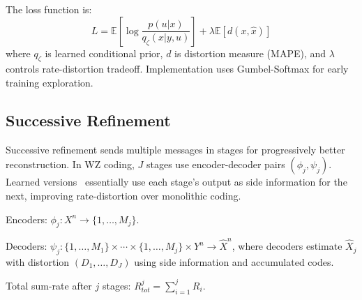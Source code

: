 The loss function is:
\begin{equation}
{L} = \mathbb{E} \left[ \log \frac{p(u|x)}{q_\zeta(x|y, u)} \right] + \lambda \mathbb{E}[d(x, \hat{x})]
\end{equation}
where $q_\zeta$ is learned conditional prior, $d$ is distortion measure (MAPE), and $\lambda$ controls rate-distortion tradeoff. Implementation uses Gumbel-Softmax for early training exploration.

\subsection{Successive Refinement}
\label{ssec:backSR}
Successive refinement sends multiple messages in stages for progressively better reconstruction. In WZ coding, $J$ stages use encoder-decoder pairs $(\phi_j, \psi_j)$. Learned versions~\cite{BorisLayeredWZ} essentially use each stage's output as side information for the next, improving rate-distortion over monolithic coding.

Encoders: $\phi_j : X^n \rightarrow \{1, \ldots, M_j\}$.

Decoders: $\psi_j : \{1, \ldots, M_1\} \times \cdots \times \{1, \ldots, M_j\} \times Y^n \rightarrow \hat{X}^n$, where decoders estimate $\hat{X}_j$ with distortion $(D_1, \ldots, D_J)$ using side information and accumulated codes.

Total sum-rate after $j$ stages: $R_{tot}^j = \sum_{i=1}^j R_i$.
